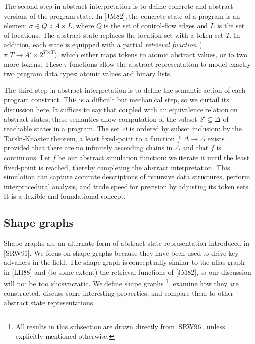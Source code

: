 \documentclass{article}
\begin{document}
The second step in abstract interpretation is to define concrete and
abstract versions of the program state.  In [JM82], the concrete state of a
program is an element $\sigma \in Q \times A \times L$, where $Q$ is the set
of control-flow edges and $L$ is the set of locations. The abstract state
replaces the location set with a token set $T$. In addition, each state is
equipped with a partial \textit{retrieval function} ($\tau : T \rightarrow
A' \times 2^{T \times T}$), which either maps tokens to atomic abstract
values, or to two more tokens. These $\tau$-functions allow the abstract
representation to model exactly two program data types: atomic values and
binary lists.

The third step in abstract interpretation is to define the semantic action
of each program construct. This is a difficult but mechanical step, so we
curtail its discussion here. It suffices to say that coupled with an
equivalence relation on abstract states, these semantics allow computation
of the subset $S' \subseteq \Delta$ of reachable states in a program.  The
set $\Delta$ is ordered by subset inclusion: by the Tarski-Knaster theorem,
a least fixed-point to a function $f: \Delta \rightarrow \Delta$ exists
provided that there are no infinitely ascending chains in $\Delta$ and
that $f$ is continuous. Let $f$ be our abstract simulation function: we 
iterate it until the least fixed-point is reached, thereby completing the
abstract interpretation. This simulation can capture accurate descriptions
of recursive data structures, perform interprocedural analysis, and trade
speed for precision by adjusting its token sets. It is a flexible and
foundational concept.

\subsection{Shape graphs}

Shape graphs are an alternate form of abstract state representation
introduced in [SRW96]. We focus on shape graphs because they have been used
to drive key advances in the field. The shape graph is conceptually similar to
the alias graph in [LH88] and (to some extent) the retrieval functions of
[JM82], so our discussion will not be too idiosyncratic. We define shape
graphs \footnote{All results in this subsection are drawn directly from
[SRW96], unless explicitly mentioned otherwise.}, examine how they are
constructed, discuss some interesting properties, and compare them to other
abstract state representations.
\end{document}
